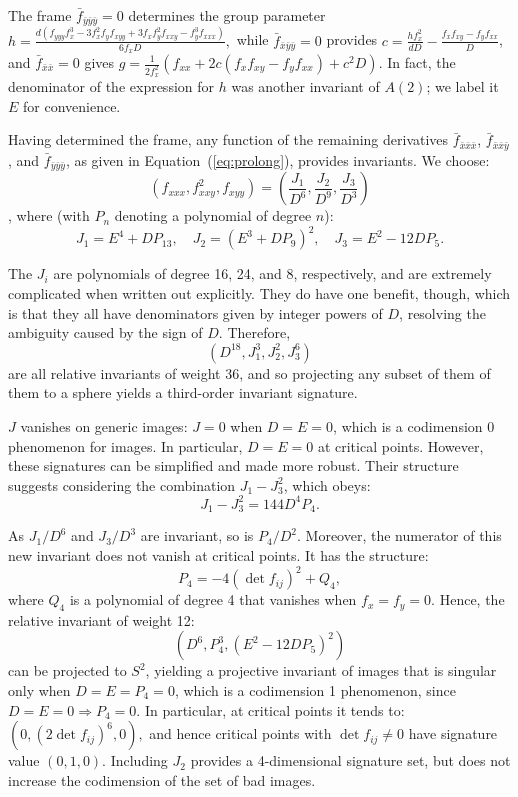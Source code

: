 \documentclass[review,onefignum,onetabnum]{siamonline190516}
\begin{document}
{The frame $\bar f_{ \bar y \bar y \bar y} = 0$ determines the group parameter $ h = \frac{d(f_{yyy}f_x^3 - 3 f_x^2 f_y f_{xyy} + 3 f_x f_y^2 f_{xxy} - f_y^3 f_{xxx})}{6 f_x D},$ while $\bar f_{ \bar x \bar y \bar y}=0$ provides $ c = \frac{h f_x^2}{d D} - \frac{f_x f_{xy} - f_y f_{xx}}{D}$, and $\bar f_{ \bar x \bar x}=0$ gives $ g = \frac{1}{2 f_x^2}(f_{xx} + 2 c ( f_x f_{xy} - f_y f_{xx} ) + c^2 D).$ In fact, the denominator of the expression for $h$ was another invariant of $A(2)$; we label it $E$ for convenience.


Having determined the frame, any function of the remaining derivatives $\bar f_{ \bar x \bar x \bar x}$, $\bar f_{ \bar x \bar x \bar y}$, and $\bar f_{ \bar y \bar y \bar y}$, as given in Equation~(\ref{eq:prolong}), provides invariants. We choose: $$ (f_{xxx}, f_{xxy}^2, f_{xyy})=\left(\frac{J_1}{D^6},\frac{J_2}{D^9},\frac{J_3}{D^3}\right)$$, where (with $P_n$ denoting a polynomial of degree $n$):
$$ J_1 = E^4 + D P_{13},\quad J_2 = (E^3 + D P_9)^2,\quad J_3=E^2 -12 D P_5.$$

The $J_i$ are polynomials of degree 16, 24, and 8, respectively, and are extremely complicated when written out explicitly. They do have one benefit, though, which is that they  all have denominators given by integer powers of $D$, resolving the ambiguity caused by the sign of $D$. Therefore, $$ (D^{18}, J_1^3, J_2^2, J_3^6)$$ are all relative invariants of weight 36, and so projecting any subset of them of them to a sphere yields a third-order invariant signature.

$J$ vanishes on generic images: $J=0$ when $D=E=0$, which is a codimension 0 phenomenon for images. In particular, $D=E=0$ at critical points. However, these signatures can be simplified and made more robust. Their structure suggests considering the combination $J_1 - J_3^2$, which obeys:
$$J_1 - J_3^2 = 144 D^4 P_4.$$

As $J_1/D^6$ and $J_3/D^3$ are invariant, so is $P_4/D^2$. 
Moreover, the numerator of this new invariant does not vanish at critical points.  It has the structure:
$$P_4 = -4(\det f_{ij})^2 + Q_4,$$
where $Q_4$ is a polynomial of degree 4 that vanishes when $f_x=f_y=0$. Hence, the relative invariant of weight 12:
$$ (D^6, P_4^3, (E^2-12D P_5)^2)$$
can be projected to $S^2$, yielding a projective invariant of images that is singular only when $D=E=P_4=0$, which is a codimension 1 phenomenon, since  $D=E=0\Rightarrow P_4=0$. In particular, at critical points it tends to:
$(0, (2\det f_{ij})^6, 0),$ and hence critical points with $\det f_{ij}\ne 0$ have signature value $(0,1,0)$.
Including $J_2$ provides a 4-dimensional signature set, but does not increase the codimension of the set of bad images.

}
\end{document}
